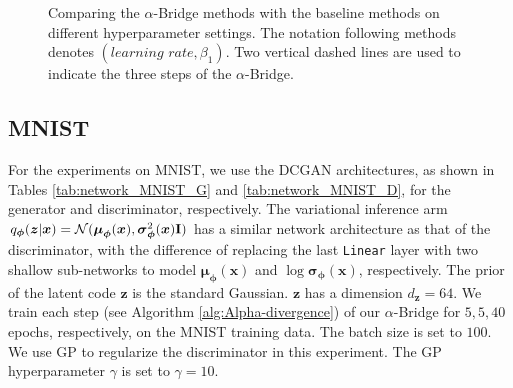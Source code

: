 \documentclass[letterpaper]{article} %
\newcommand{\Nc}[0]{\ensuremath{\mathcal{N}} }
\newcommand{\Imat}[0]{\ensuremath{{\bf I}} }
\newcommand{\xv}[0]{\ensuremath{\boldsymbol{x}} }
\newcommand{\zv}[0]{\ensuremath{\boldsymbol{z}} }
\newcommand{\muv}[0]{\ensuremath{\boldsymbol{\mu}} }
\newcommand{\sigmav}[0]{\ensuremath{\boldsymbol{\sigma}} }
\newcommand{\phiv}[0]{\ensuremath{\boldsymbol{\phi}} }
\begin{document}
\begin{figure}[H]
	\begin{center}
		\caption{\small Comparing the $\alpha$-Bridge methods with the baseline methods on different hyperparameter settings. The notation following methods denotes $(\textit{learning rate}, \beta_1)$. Two vertical dashed lines are used to indicate the three steps of the $\alpha$-Bridge.
		}
		\label{fig:4compare_4robust}
	\end{center}
\end{figure}





\subsection{MNIST}\label{sec:app_exp_mnist}



For the experiments on MNIST, we use the DCGAN \cite{radford2015unsupervised} architectures, as shown in Tables \ref{tab:network_MNIST_G} and \ref{tab:network_MNIST_D}, for the generator and discriminator, respectively.
The variational inference arm $q_{\phiv}(\zv|\xv)=\Nc(\muv_{\phiv}(\xv), \sigmav^2_{\phiv}(\xv)\Imat)$ has a similar network architecture as that of the discriminator, with the difference of replacing the last {\tt Linear} layer with two shallow sub-networks to model $\muv_{\phiv}(\xv)$ and $\log\sigmav_{\phiv}(\xv)$, respectively.
The prior of the latent code $\zv$ is the standard Gaussian. $\zv$ has a dimension $d_{\zv}=64$. 
We train each step (see Algorithm \ref{alg:Alpha-divergence}) of our $\alpha$-Bridge for $5, 5, 40$ epochs, respectively, on the MNIST training data.   
The batch size is set to $100$.
We use GP to regularize the discriminator in this experiment. 
The GP hyperparameter $\gamma$ is set to $\gamma=10$.
\end{document}
